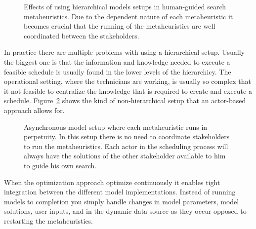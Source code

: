 \begin{figure}[H]
	
	\label{fig:discussion:hierarchical_model_setup}
	\caption{Effects of using hierarchical models setups in human-guided search metaheuristics.
	Due to the dependent nature of each metaheuristic it becomes crucial that the running of 
	the metaheuristics are well coordinated between the stakeholders.}
\end{figure}

In practice there are multiple problems with using a hierarchical setup.
Usually the biggest one is that the information and knowledge needed to 
execute a feasible schedule is usually found in the lower levels of the 
hierarchicy. The operational setting, where the
technicians are working, is usually so complex that it not feasible to 
centralize the knowledge that is required to create and execute a 
schedule. Figure~\ref{fig:discussion:asynchronous_setup}
shows the kind of non-hierarchical setup that an actor-based approach 
allows for.

\begin{figure}[H]
	
	\caption{Asynchronous model setup where each metaheuristic runs in perpetuity. In this setup
	there is no need to coordinate stakeholders to run the metaheuristics. Each actor in the 
	scheduling process will always have the solutions of the other stakeholder available to 
	him to guide his own search.}
	\label{fig:discussion:asynchronous_setup}
\end{figure}

When the optimization approach optimize continuously it enables tight
integration between the different model implementations. Instead of running
models to completion you simply handle changes in model parameters, model
solutions, user inputs, and in the dynamic data source as they occur opposed to
restarting the metaheuristics.

